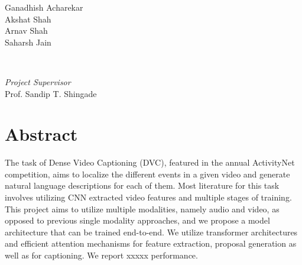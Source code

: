 \documentclass[]{book}
\begin{document}
\begin{titlepage}
	\begin{minipage}{0.4\textwidth}
		\begin{flushleft}
			\large
			Ganadhish Acharekar\\
			Akshat Shah\\
			Arnav Shah\\
			Saharsh Jain
		\end{flushleft}
	\end{minipage}
	~
	\begin{minipage}{0.4\textwidth}
		\begin{flushright}
			\large
			\textit{Project Supervisor}\\
			Prof. Sandip T. Shingade
		\end{flushright}
	\end{minipage}
	
	
	
	
	
	
	 
	
	\vfill %
	
\end{titlepage}








\chapter*{Abstract}
The task of Dense Video Captioning (DVC), featured in the annual ActivityNet competition, aims to localize the different events in a given video and generate natural language descriptions for each of them. Most literature for this task involves utilizing CNN extracted video features and multiple stages of training. This project aims to utilize multiple modalities, namely audio and video, as opposed to previous single modality approaches, and we propose a model architecture that can be trained end-to-end. We utilize transformer architectures and efficient attention mechanisms for feature extraction, proposal generation as well as for captioning. We report xxxxx performance.
\end{document}
